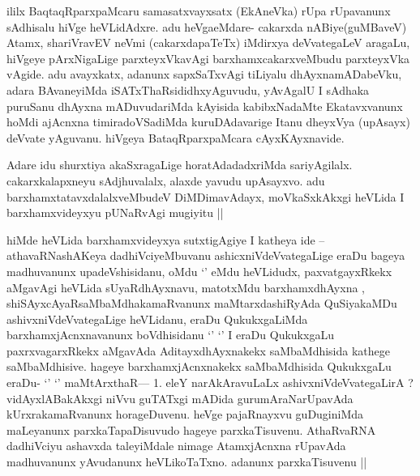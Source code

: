 \begin{center}


\end{center}

\begin{artha}
ililx BaqtaqRparxpaMcaru samasatxvayxsatx (EkAneVka) rUpa rUpavanunx sAdhisalu hiVge heVLidAdxre. adu heVgaeMdare- cakarxda nABiye(guMBaveV) Atamx, shariVravEV neVmi (cakarxdapaTeTx) iMdirxya deVvategaLeV aragaLu, hiVgeye pArxNigaLige parxteyxVkavAgi barxhamxcakarxveMbudu parxteyxVka vAgide. adu avayxkatx, adanunx sapxSaTxvAgi tiLiyalu dhAyxnamADabeVku, adara BAvaneyiMda iSATxThaRsididhxyAguvudu, yAvAgalU I sAdhaka puruSanu dhAyxna mADuvudariMda kAyisida kabibxNadaMte Ekatavxvanunx hoMdi ajAcnxna timiradoVSadiMda kuruDAdavarige Itanu dheyxVya (upAsayx) deVvate  yAguvanu. hiVgeya BataqRparxpaMcara cAyxKAyxnavide.
\end{artha}

\begin{center}


\end{center}

\begin{artha}
Adare idu shurxtiya akaSxragaLige horatAdadadxriMda sariyAgilalx. cakarxkalapxneyu 
sAdjhuvalalx, alaxde yavudu upAsayxvo. adu barxhamxtatavxdalalxveMbudeV DiMDimavAdayx, 
moVkaSxkAkxgi heVLida I barxhamxvideyxyu pUNaRvAgi mugiyitu ||
\end{artha}

\begin{artha}
hiMde heVLida barxhamxvideyxya sutxtigAgiye I katheya ide -- athavaRNashAKeya dadhiVciyeMbuvanu ashicxniVdeVvategaLige eraDu bageya madhuvanunx upadeVshisidanu, oMdu `\stext' eMdu heVLidudx, paxvatgayxRkekx aMgavAgi heVLida sUyaRdhAyxnavu, matotxMdu barxhamxdhAyxna , shiSAyxcAyaRsaMbaMdhakamaRvanunx maMtarxdashiRyAda QuSiyakaMDu ashivxniVdeVvategaLige heVLidanu, eraDu QukukxgaLiMda barxhamxjAcnxnavanunx boVdhisidanu
`\stext' `\stext' I eraDu QukukxgaLu paxrxvagarxRkekx aMgavAda AditayxdhAyxnakekx saMbaMdhisida kathege saMbaMdhisive. hageye barxhamxjAcnxnakekx saMbaMdhisida QukukxgaLu eraDu- `\stext' `\stext'  maMtArxthaR--- 1. eleY narAkAravuLaLx ashivxniVdeVvategaLirA ? vidAyxlABakAkxgi niVvu guTATxgi mADida gurumAraNarUpavAda kUrxrakamaRvanunx horageDuvenu. heVge pajaRnayxvu guDuginiMda maLeyanunx parxkaTapaDisuvudo hageye parxkaTisuvenu. AthaRvaRNA dadhiVciyu ashavxda taleyiMdale nimage AtamxjAcnxna rUpavAda madhuvanunx yAvudanunx heVLikoTaTxno. adanunx parxkaTisuvenu ||
\end{artha}


